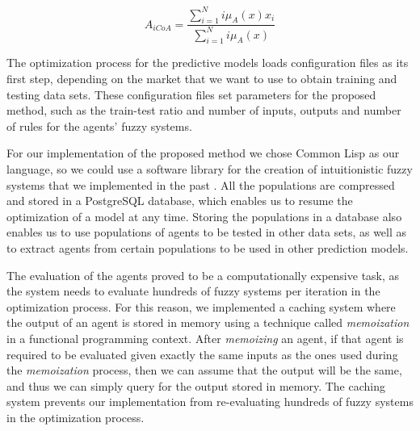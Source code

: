 \documentclass{ieeeaccess}
\begin{document}
\begin{equation}
  \label{equation:activation-score}
  A_{iCoA} = \dfrac{\sum_{i=1}^{N} i\mu_{A}(x) x_{i}}{\sum_{i=1}^{N}
    i\mu_{A}(x)}
\end{equation}

The optimization process for the predictive models loads configuration
files as its first step, depending on the market that we want to use
to obtain training and testing data sets. These configuration files
set parameters for the proposed method, such as the train-test ratio
and number of inputs, outputs and number of rules for the agents'
fuzzy systems.

For our implementation of the proposed method we chose Common Lisp as
our language, so we could use a software library for the creation of
intuitionistic fuzzy systems that we implemented in the past
\cite{Hernandez-Aguila2016} \cite{Hernandez-Aguila2017-2}. All the
populations are compressed and stored in a PostgreSQL database, which
enables us to resume the optimization of a model at any
time. Storing the populations in a database also enables us to use
populations of agents to be tested in other data sets, as well as to
extract agents from certain populations to be used in other prediction
models.

The evaluation of the agents proved to be a computationally expensive
task, as the system needs to evaluate hundreds of fuzzy systems per
iteration in the optimization process. For this reason, we implemented
a caching system where the output of an agent is stored in memory
using a technique called \textit{memoization}
\cite{johnson1995memoization} in a functional programming
context. After \textit{memoizing} an agent, if that agent is required
to be evaluated given exactly the same inputs as the ones used during
the \textit{memoization} process, then we can assume that the output
will be the same, and thus we can simply query for the output stored
in memory. The caching system prevents our implementation from
re-evaluating hundreds of fuzzy systems in the optimization process.


\end{document}
